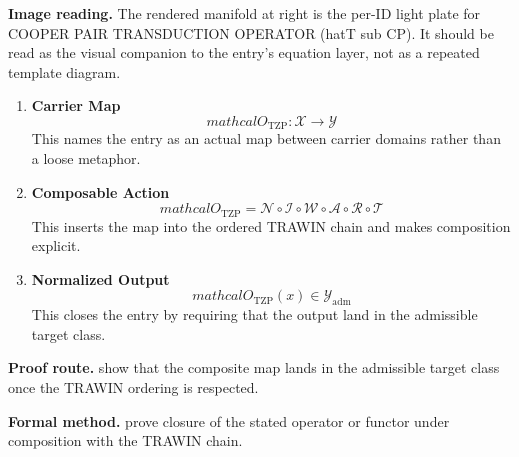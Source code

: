 \begin{samepage}
\noindent\begin{minipage}[t]{0.45\linewidth}
\vspace{0pt}
\raggedright
\scriptsize\textbf{Image reading.} The rendered manifold at right is the per-ID light plate for COOPER PAIR TRANSDUCTION OPERATOR (hatT sub CP). It should be read as the visual companion to the entry's equation layer, not as a repeated template diagram.\par
\end{minipage}\hfill
\begin{minipage}[t]{0.53\linewidth}
\vspace*{-0.10in}
\raggedright
{}
\end{minipage}
\end{samepage}

\clearpage


\begin{enumerate}[leftmargin=1.6em,itemsep=9pt,topsep=6pt]
\item \textbf{Carrier Map}
\[
mathcal{O}_{\mathrm{TZP}} : \mathcal{X} \to \mathcal{Y}
\]
This names the entry as an actual map between carrier domains rather than a loose metaphor.

\item \textbf{Composable Action}
\[
mathcal{O}_{\mathrm{TZP}} = \mathcal{N}\circ \mathcal{I}\circ \mathcal{W}\circ \mathcal{A}\circ \mathcal{R}\circ \mathcal{T}
\]
This inserts the map into the ordered TRAWIN chain and makes composition explicit.

\item \textbf{Normalized Output}
\[
mathcal{O}_{\mathrm{TZP}}(x) \in \mathcal{Y}_{\mathrm{adm}}
\]
This closes the entry by requiring that the output land in the admissible target class.
\end{enumerate}

\textbf{Proof route.} show that the composite map lands in the admissible target class once the TRAWIN ordering is respected.

\textbf{Formal method.} prove closure of the stated operator or functor under composition with the TRAWIN chain.

\medskip
{}

